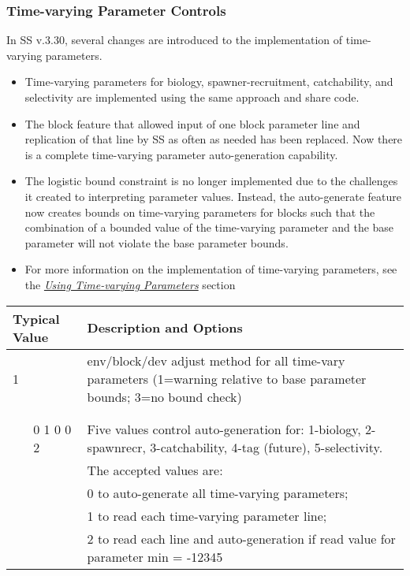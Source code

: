 \subsubsection{Time-varying Parameter Controls}
In SS v.3.30, several changes are introduced to the implementation of time-varying parameters.

\begin{itemize}
  \item	Time-varying parameters for biology, spawner-recruitment, catchability, and selectivity are implemented using the same approach and share code.
  \item The block feature that allowed input of one block parameter line and replication of that line by SS as often as needed has been replaced.  Now there is a complete time-varying parameter auto-generation capability.
  \item The logistic bound constraint is no longer implemented due to the challenges it created to interpreting parameter values.  Instead, the auto-generate feature now creates bounds on time-varying parameters for blocks such that the combination of a bounded  value of the time-varying parameter and the base parameter will not violate the base parameter bounds.
  \item For more information on the implementation of time-varying parameters, see the \hyperlink{TVpara}{\textit{Using Time-varying Parameters}} section
\end{itemize}	
	
\pagebreak
\begin{longtable}{p{0.5cm} p{2cm} p{12cm}}
     \multicolumn{2}{l}{Typical Value} & Description and Options\\
     \hline
	 1 & & \multirow{1}{6cm}[-0.1cm]{\parbox{12cm}{env/block/dev adjust method for all time-vary parameters (1=warning relative to base parameter bounds; 3=no bound check)}}
	\\ \\ \\
	& 0 1 0 0 2 & Five values control auto-generation for:  1-biology, 2-spawnrecr, 3-catchability, 4-tag (future), 5-selectivity.\\
	&			& The accepted values are:\\
	&           & 0 to auto-generate all time-varying parameters;\\
	& 			& 1 to read each time-varying parameter line;\\
	&			& 2 to read each line and auto-generation if read value for parameter min = -12345 \\
	\hline
\end{longtable}


